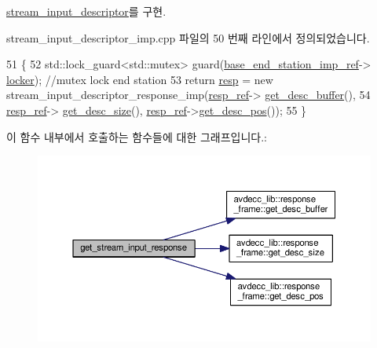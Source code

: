 \hyperlink{classavdecc__lib_1_1stream__input__descriptor_a1be36084f46cee6b34b31b75e7667cc6}{stream\+\_\+input\+\_\+descriptor}를 구현.



stream\+\_\+input\+\_\+descriptor\+\_\+imp.\+cpp 파일의 50 번째 라인에서 정의되었습니다.


\begin{DoxyCode}
51 \{
52     std::lock\_guard<std::mutex> guard(\hyperlink{classavdecc__lib_1_1descriptor__base__imp_a550c969411f5f3b69f55cc139763d224}{base\_end\_station\_imp\_ref}->
      \hyperlink{classavdecc__lib_1_1end__station__imp_a2207f93fef130266b292686bf96ef8d3}{locker}); \textcolor{comment}{//mutex lock end station}
53     \textcolor{keywordflow}{return} \hyperlink{classavdecc__lib_1_1stream__input__descriptor__imp_aa951b788e797f7a00d516ea52ba0b10f}{resp} = \textcolor{keyword}{new} stream\_input\_descriptor\_response\_imp(\hyperlink{classavdecc__lib_1_1descriptor__base__imp_a2642e3a7c10d38553e7ff4a55e875346}{resp\_ref}->
      \hyperlink{classavdecc__lib_1_1response__frame_a87db6e7ad7e047437cf9c9eaab873626}{get\_desc\_buffer}(),
54                                                            \hyperlink{classavdecc__lib_1_1descriptor__base__imp_a2642e3a7c10d38553e7ff4a55e875346}{resp\_ref}->
      \hyperlink{classavdecc__lib_1_1response__frame_a5302ae13c549f066040ce0e7c7d11ae6}{get\_desc\_size}(), \hyperlink{classavdecc__lib_1_1descriptor__base__imp_a2642e3a7c10d38553e7ff4a55e875346}{resp\_ref}->\hyperlink{classavdecc__lib_1_1response__frame_a6e6f6cc3d681d41c6de6139ca9cb79d9}{get\_desc\_pos}());
55 \}
\end{DoxyCode}


이 함수 내부에서 호출하는 함수들에 대한 그래프입니다.\+:
\nopagebreak
\begin{figure}[H]
\begin{center}
\leavevmode
\includegraphics[width=350pt]{classavdecc__lib_1_1stream__input__descriptor__imp_ac485b8bb5da1823e61f46e7252f2f048_cgraph}
\end{center}
\end{figure}


